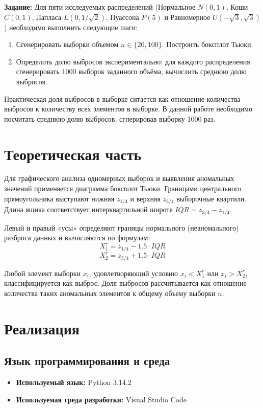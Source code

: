\documentclass[a4paper, 14pt]{extarticle}
\begin{document}
\textbf{Задание:}
Для пяти исследуемых распределений (Нормальное $N(0, 1)$, Коши $C(0, 1)$, Лапласа $L(0, 1/\sqrt{2})$, Пуассона $P(5)$ и Равномерное $U(-\sqrt{3}, \sqrt{3})$) необходимо выполнить следующие шаги:
\begin{enumerate}
    \item Сгенерировать выборки объемом $n \in \{20, 100\}$. Построить боксплот Тьюки.
    \item  Определить долю выбросов экспериментально: для каждого распределения сгенерировать 1000 выборок заданного объёма, вычислить среднюю долю выбросов.
\end{enumerate}

Практическая доля выбросов в выборке ситается как отношение количества выбросов к
количеству всех элементов в выборке. В данной работе необходимо посчитать среднюю
долю выбросов, сгнерировав выборку 1000 раз.

\section{Теоретическая часть}

Для графического анализа одномерных выборок и выявления аномальных значений применяется диаграмма боксплот Тьюки. Границами центрального прямоугольника выступают нижняя $z_{1/4}$ и верхняя $z_{3/4}$ выборочные квартили. Длина ящика соответствует интерквартильной широте $IQR = z_{3/4} - z_{1/4}$.

Левый и правый «усы» определяют границы нормального (неаномального) разброса данных и вычисляются по формулам:
\begin{equation}
    X_1^r = z_{1/4} - 1.5 \cdot IQR
\end{equation}
\begin{equation}
    X_2^r = z_{3/4} + 1.5 \cdot IQR
\end{equation}

Любой элемент выборки $x_i$, удовлетворяющий условию $x_i < X_1^r$ или $x_i > X_2^r$, классифицируется как выброс. Доля выбросов рассчитывается как отношение количества таких аномальных элементов к общему объему выборки $n$.
\section{Реализация}

\subsection{Язык программирования и среда}
    \begin{itemize}
        \item \textbf{Используемый язык:} Python 3.14.2
        \item \textbf{Используемая среда разработки:} Visual Studio Code
    \end{itemize}
\end{document}
